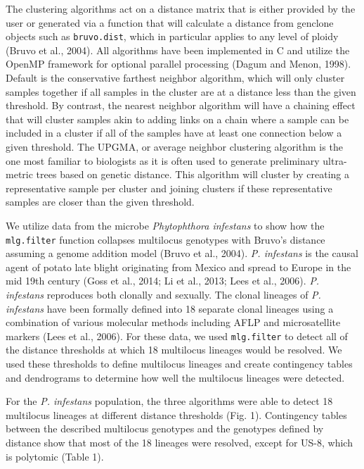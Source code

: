 \documentclass{frontiersSCNS} %
\begin{document}
The clustering algorithms act on a distance matrix that is either
provided by the user or generated via a function that will calculate a
distance from genclone objects such as \texttt{bruvo.dist}, which in
particular applies to any level of ploidy (Bruvo et al., 2004). All
algorithms have been implemented in C and utilize the OpenMP framework
for optional parallel processing (Dagum and Menon, 1998). Default is the
conservative farthest neighbor algorithm, which will only cluster
samples together if all samples in the cluster are at a distance less
than the given threshold. By contrast, the nearest neighbor algorithm
will have a chaining effect that will cluster samples akin to adding
links on a chain where a sample can be included in a cluster if all of
the samples have at least one connection below a given threshold. The
UPGMA, or average neighbor clustering algorithm is the one most familiar
to biologists as it is often used to generate preliminary ultra-metric
trees based on genetic distance. This algorithm will cluster by creating
a representative sample per cluster and joining clusters if these
representative samples are closer than the given threshold.

We utilize data from the microbe \emph{Phytophthora infestans} to show
how the \texttt{mlg.filter} function collapses multilocus genotypes with
Bruvo's distance assuming a genome addition model (Bruvo et al., 2004).
\emph{P. infestans} is the causal agent of potato late blight
originating from Mexico and spread to Europe in the mid 19th century
(Goss et al., 2014; Li et al., 2013; Lees et al., 2006). \emph{P.
infestans} reproduces both clonally and sexually. The clonal lineages of
\emph{P. infestans} have been formally defined into 18 separate clonal
lineages using a combination of various molecular methods including AFLP
and microsatellite markers (Lees et al., 2006). For these data, we used
\texttt{mlg.filter} to detect all of the distance thresholds at which 18
multilocus lineages would be resolved. We used these thresholds to
define multilocus lineages and create contingency tables and dendrograms
to determine how well the multilocus lineages were detected.

For the \emph{P. infestans} population, the three algorithms were able
to detect 18 multilocus lineages at different distance thresholds (Fig.
1). Contingency tables between the described multilocus genotypes and
the genotypes defined by distance show that most of the 18 lineages were
resolved, except for US-8, which is polytomic (Table 1).
\end{document}
